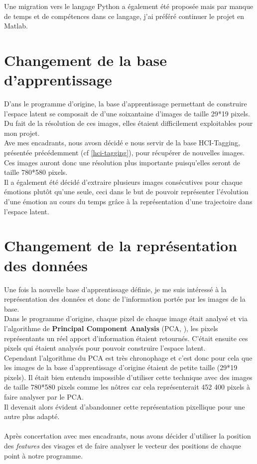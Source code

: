 \documentclass[poster]{polytech/polytech}
\begin{document}
Une migration vers le langage Python a également été proposée mais par manque de temps et de compétences dans ce langage, j'ai préféré continuer le projet en Matlab.
\newpage

\section{Changement de la base d'apprentissage}
D'ans le programme d'origine, la base d'apprentissage permettant de construire l'espace latent se composait de d'une soixantaine d'images de taille 29*19 pixels.\\
Du fait de la résolution de ces images, elles étaient difficilement exploitables pour mon projet.\\
Ave mes encadrants, nous avosn décidé e nous servir de la base HCI-Tagging, présentée précédemment (cf \autoref{hci-tagging}), pour récupérer de nouvelles images. Ces images auront donc une résolution plus importante puisqu'elles seront de taille 780*580 pixels.\\
Il a également été décidé d'extraire plusieurs images consécutives pour chaque émotions plutôt qu'une seule, ceci dans le but de pouvoir représenter l'évolution d'une émotion au cours du temps grâce à la représentation d'une trajectoire dans l'espace latent.

\section{Changement de la représentation des données}
Une fois la nouvelle base d'apprentissage définie, je me suis intéressé à la représentation des données et donc de l'information portée par les images de la base.\\
Dans le programme d'origine, chaque pixel de chaque image était analysé et via l'algorithme de \textbf{Principal Component Analysis} (PCA, \cite{book_pca}), les pixels représentants un réel apport d'information étaient retournés. C'était ensuite ces pixels qui étaient analysés pour pouvoir construire l'espace latent.\\
Cependant l'algorithme du PCA est très chronophage et c'est donc pour cela que les images de la base d'apprentissage d'origine étaient de petite taille (29*19 pixels). Il était bien entendu impossible d'utiliser cette technique avec des images de taille 780*580 pixels comme les nôtres car cela représenterait 452 400 pixels à faire analyser par le PCA.\\
Il devenait alors évident d'abandonner cette représentation pixellique pour une autre plus adapté.\\
\\
Après concertation avec mes encadrants, nous avons décider d'utiliser la position des \textit{features} des visages et de faire analyser le vecteur des positions de chaque point à notre programme.
\end{document}
